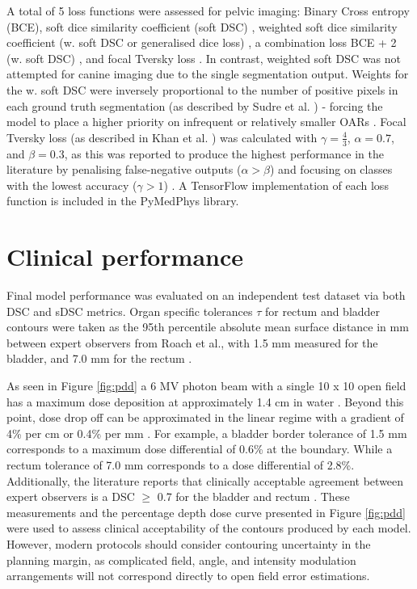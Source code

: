 A total of 5 loss functions were assessed for pelvic imaging: Binary Cross
entropy (BCE), soft dice similarity coefficient (soft DSC) \cite{Bertels2019},
weighted soft dice similarity coefficient (w. soft DSC or generalised dice loss)
\cite{Sudre_2017}, a combination loss BCE + 2 (w. soft DSC)
\cite{taghanaki2018}, and focal Tversky loss \cite{Zhu_2018, Khan2019,
abraham2018}. In contrast, weighted soft DSC was not attempted for canine
imaging due to the single segmentation output. Weights for the w. soft DSC were
inversely proportional to the number of positive pixels in each ground truth
segmentation (as described by Sudre et al. \cite{Sudre_2017}) - forcing the
model to place a higher priority on infrequent or relatively smaller OARs
\cite{Sudre_2017}. Focal Tversky loss (as described in Khan et al.
\cite{Khan2019}) was calculated with $\gamma = \frac{4}{3}$, $\alpha=0.7$, and
$\beta=0.3$, as this was reported to produce the highest performance in the
literature \cite{Khan2019} by penalising false-negative outputs ($\alpha >
\beta$) and focusing on classes with the lowest accuracy ($\gamma > 1$)
\cite{Khan2019}. A TensorFlow implementation of each loss function is included
in the PyMedPhys library.

\section{Clinical performance}

Final model performance was evaluated on an independent test dataset via both
DSC and sDSC metrics. Organ specific tolerances $\tau$ for rectum and bladder
contours were taken as the 95th percentile absolute mean surface distance in mm
between expert observers from Roach et al., with 1.5 mm measured for the
bladder, and 7.0 mm for the rectum \cite{Roach_2019}.

As seen in Figure \ref{fig:pdd} a 6 MV photon beam with a single 10 x 10 open
field has a maximum dose deposition at approximately 1.4 cm in water
\cite{Nurdin}. Beyond this point, dose drop off can be approximated in the
linear regime with a gradient of 4\% per cm or 0.4\% per mm \cite{Nurdin}. For
example, a bladder border tolerance of 1.5 mm corresponds to a maximum dose
differential of 0.6\% at the boundary. While a rectum tolerance of 7.0 mm
corresponds to a dose differential of 2.8\%. Additionally, the literature
reports that clinically acceptable agreement between expert observers is a DSC
$\geq$ 0.7 for the bladder and rectum \cite{Roach_2019}. These measurements and
the percentage depth dose curve presented in Figure \ref{fig:pdd} were used to
assess clinical acceptability of the contours produced by each model. However,
modern protocols should consider contouring uncertainty in the planning margin,
as complicated field, angle, and intensity modulation arrangements will not
correspond directly to open field error estimations.


